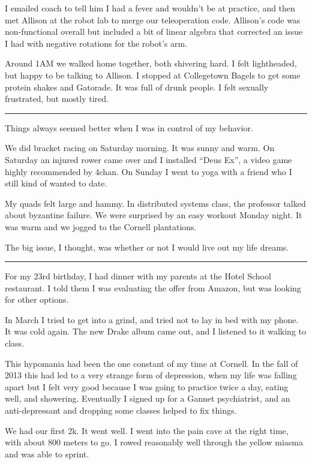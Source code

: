 I emailed coach to tell him I had a fever and wouldn't be at practice, and then
met Allison at the robot lab to merge our teleoperation code.   Allison's code
was non-functional overall but included a bit of linear algebra that corrected
an issue I had with negative rotations for the robot's arm.

Around 1AM we walked home together, both shivering hard.  I felt lightheaded,
but happy to be talking to Allison.  I stopped at Collegetown Bagels to get some
protein shakes and Gatorade.  It was full of drunk people.  I felt sexually
frustrated, but mostly tired.

\plainfancybreak{12pt}{2}{* * *}

Things always seemed better when I was in control of my behavior.

We did bracket racing on Saturday morning.  It was sunny and warm.    On
Saturday an injured rower came over and I installed ``Deus Ex'', a video game
highly recommended by 4chan.   On Sunday I went to yoga with a friend who I
still kind of wanted to date.

My quads felt large and hammy.  In distributed systems class, the professor
talked about byzantine failure.  We were surprised by an easy workout Monday
night.  It was warm and we jogged to the Cornell plantations.

The big issue, I thought, was whether or not I would live out my life dreams.

\plainfancybreak{12pt}{2}{* * *}

For my 23rd birthday, I had dinner with my parents at the Hotel School
restaurant.  I told them I was evaluating the offer from Amazon, but was looking
for other options.

In March I tried to get into a grind, and tried not to lay in bed with my phone.
It was cold again.  The new Drake album came out, and I listened to it walking
to class.  

This hypomania had been the one constant of my time at Cornell.  In the fall of
2013 this had led to a very strange form of depression, when my life was falling
apart but I felt very good because I was going to practice twice a day, eating
well, and showering.  Eventually I signed up for a Gannet psychiatrist, and an
anti-depressant and dropping some classes helped to fix things.

We had our first 2k.  It went well.  I went into the pain cave at the right
time, with about 800 meters to go.  I rowed reasonably well through the yellow
miasma and was able to sprint.  

